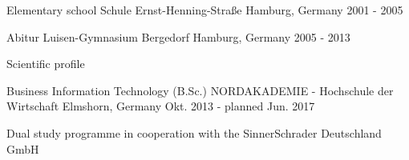 

\begin{cventries}

  \cventry
    {Elementary school} %
    {Schule Ernst-Henning-Straße} %
    {Hamburg, Germany} %
    {2001 - 2005} %
    {}

  \cventry
    {Abitur} %
    {Luisen-Gymnasium Bergedorf} %
    {Hamburg, Germany} %
    {2005 - 2013} %
    {
      \begin{cvitems} %
        \item {Scientific profile}
      \end{cvitems}
    }

  \cventry
    {Business Information Technology (B.Sc.)} %
    {NORDAKADEMIE - Hochschule der Wirtschaft} %
    {Elmshorn, Germany} %
    {Okt. 2013 - planned Jun. 2017} %
    {
      \begin{cvitems} %
        \item {Dual study programme in cooperation with the SinnerSchrader Deutschland GmbH}
      \end{cvitems}
    }

\end{cventries}
